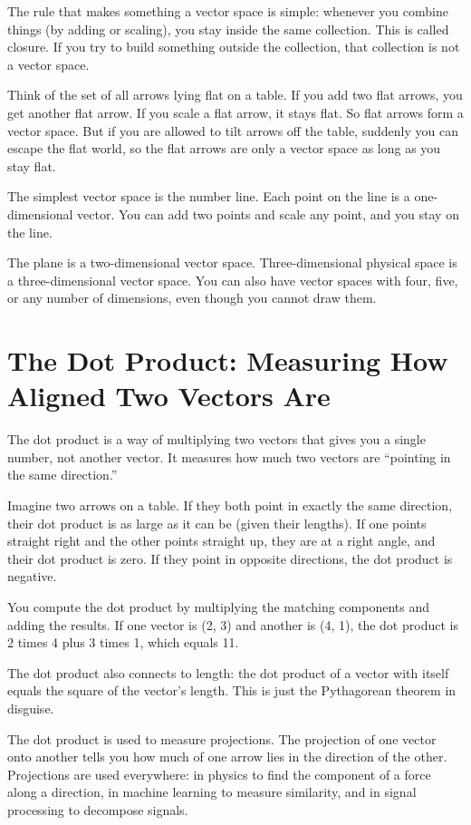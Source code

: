 \documentclass[11pt]{article}
\begin{document}
The rule that makes something a vector space is simple: whenever you combine things (by adding or scaling), you stay inside the same collection. This is called closure. If you try to build something outside the collection, that collection is not a vector space.

Think of the set of all arrows lying flat on a table. If you add two flat arrows, you get another flat arrow. If you scale a flat arrow, it stays flat. So flat arrows form a vector space. But if you are allowed to tilt arrows off the table, suddenly you can escape the flat world, so the flat arrows are only a vector space as long as you stay flat.

The simplest vector space is the number line. Each point on the line is a one-dimensional vector. You can add two points and scale any point, and you stay on the line.

The plane is a two-dimensional vector space. Three-dimensional physical space is a three-dimensional vector space. You can also have vector spaces with four, five, or any number of dimensions, even though you cannot draw them.

\section*{The Dot Product: Measuring How Aligned Two Vectors Are}

The dot product is a way of multiplying two vectors that gives you a single number, not another vector. It measures how much two vectors are ``pointing in the same direction.''

Imagine two arrows on a table. If they both point in exactly the same direction, their dot product is as large as it can be (given their lengths). If one points straight right and the other points straight up, they are at a right angle, and their dot product is zero. If they point in opposite directions, the dot product is negative.

You compute the dot product by multiplying the matching components and adding the results. If one vector is (2, 3) and another is (4, 1), the dot product is 2 times 4 plus 3 times 1, which equals 11.

The dot product also connects to length: the dot product of a vector with itself equals the square of the vector's length. This is just the Pythagorean theorem in disguise.

The dot product is used to measure projections. The projection of one vector onto another tells you how much of one arrow lies in the direction of the other. Projections are used everywhere: in physics to find the component of a force along a direction, in machine learning to measure similarity, and in signal processing to decompose signals.
\end{document}
